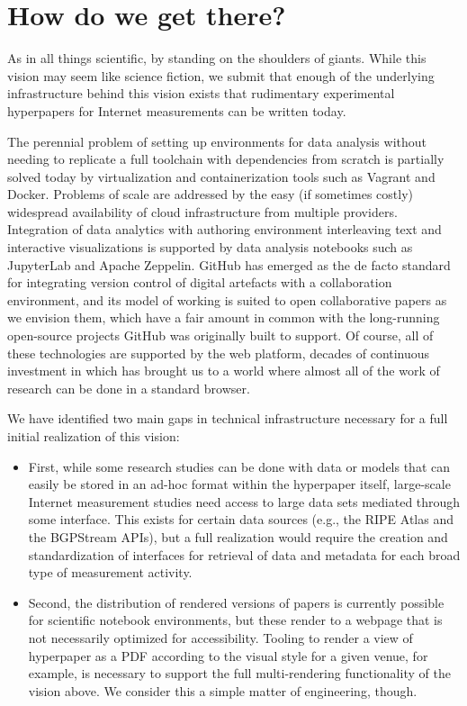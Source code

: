 \documentclass[sigconf]{acmart}
\begin{document}
\section{How do we get there?}
\label{sec:how}

As in all things scientific, by standing on the shoulders of giants. While this
vision may seem like science fiction, we submit that enough of the underlying
infrastructure behind this vision exists that rudimentary experimental
hyperpapers for Internet measurements can be written today.

The perennial problem of setting up environments for data analysis without
needing to replicate a full toolchain with dependencies from scratch is
partially solved today by virtualization and containerization tools such as
Vagrant and Docker. Problems of scale are addressed by the easy (if sometimes
costly) widespread availability of cloud infrastructure from multiple
providers.  Integration of data analytics with authoring environment
interleaving text and interactive visualizations is supported by data analysis
notebooks such as JupyterLab and Apache Zeppelin. GitHub has emerged as the de
facto standard for integrating version control of digital artefacts with a
collaboration environment, and its model of working is suited to open
collaborative papers as we envision them, which have a fair amount in common
with the long-running open-source projects GitHub was originally built to
support. Of course, all of these technologies are supported by the web
platform, decades of continuous investment in which has brought us to a world
where almost all of the work of research can be done in a standard browser.

We have identified two main gaps in technical infrastructure necessary for a
full initial realization of this vision:

\begin{itemize}
	
	\item First, while some research studies can be done with data or models
that can easily be stored in an ad-hoc format within the hyperpaper itself,
large-scale Internet measurement studies need access to large data sets mediated
through some interface. This exists for certain data sources (e.g., the RIPE
Atlas and the BGPStream APIs), but a full realization would require the creation
and standardization of interfaces for retrieval of data and metadata for each
broad type of measurement activity.

	\item Second, the distribution of rendered versions of papers is currently
	possible for scientific notebook environments, but these render to a webpage
	that is not necessarily optimized for accessibility. Tooling to render a
	view of hyperpaper as a PDF according to the visual style for a given venue,
	for example, is necessary to support the full multi-rendering functionality
	of the vision above. We consider this a simple matter of engineering,
	though.

\end{itemize}
\end{document}

